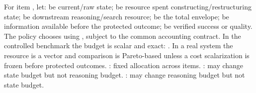 \markdownRendererDocumentBegin
\markdownRendererSectionBegin
{}\markdownRendererInterblockSeparator
{}For item , let:\markdownRendererInterblockSeparator
{}\markdownRendererUlBeginTight
\markdownRendererUlItem {} be current/raw state;\markdownRendererUlItemEnd 
\markdownRendererUlItem {} be resource spent constructing/restructuring state;\markdownRendererUlItemEnd 
\markdownRendererUlItem {} be downstream reasoning/search resource;\markdownRendererUlItemEnd 
\markdownRendererUlItem {} be the total envelope;\markdownRendererUlItemEnd 
\markdownRendererUlItem {} be information available before the protected outcome;\markdownRendererUlItemEnd 
\markdownRendererUlItem {} be verified success or quality.\markdownRendererUlItemEnd 
\markdownRendererUlEndTight \markdownRendererInterblockSeparator
{}The policy chooses  using , subject to the common accounting contract. In the controlled benchmark the budget is scalar and exact: . In a real system the resource is a vector and comparison is Pareto-based unless a cost scalarization is frozen before protected outcomes.\markdownRendererInterblockSeparator
{}\markdownRendererSectionBegin
{}\markdownRendererInterblockSeparator
{}\markdownRendererUlBeginTight
\markdownRendererUlItem {}: fixed allocation across items.\markdownRendererUlItemEnd 
\markdownRendererUlItem {}: may change state budget but not reasoning budget.\markdownRendererUlItemEnd 
\markdownRendererUlItem {}: may change reasoning budget but not state budget.\markdownRendererUlItemEnd 
